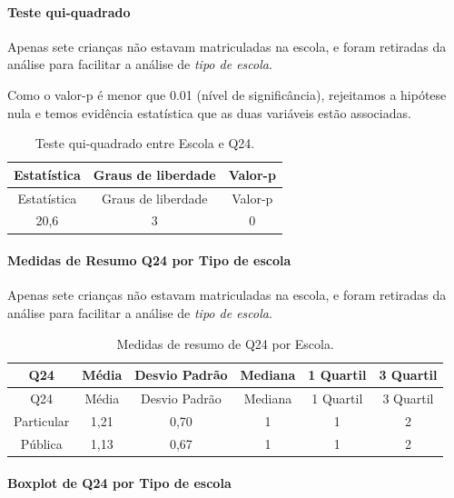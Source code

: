 \documentclass[]{article}
\let\oldparagraph\paragraph
\renewcommand{\paragraph}[1]{\oldparagraph{#1}\mbox{}}
\begin{document}
\hypertarget{teste-qui-quadrado-56}{%
\paragraph{Teste qui-quadrado}\label{teste-qui-quadrado-56}}

Apenas sete crianças não estavam matriculadas na escola, e foram retiradas da análise para facilitar a análise de \emph{tipo de escola}.

Como o valor-p é menor que 0.01 (nível de significância), rejeitamos a hipótese nula e temos evidência estatística que as duas variáveis estão associadas.

\begin{longtable}[]{@{}ccc@{}}
\caption{\label{tab:unnamed-chunk-645}Teste qui-quadrado entre Escola e Q24.}\tabularnewline
\toprule
Estatística & Graus de liberdade & Valor-p\tabularnewline
\midrule
\endfirsthead
\toprule
Estatística & Graus de liberdade & Valor-p\tabularnewline
\midrule
\endhead
20,6 & 3 & 0\tabularnewline
\bottomrule
\end{longtable}

\cleardoublepage

\hypertarget{medidas-de-resumo-q24-por-tipo-de-escola}{%
\paragraph{Medidas de Resumo Q24 por Tipo de escola}\label{medidas-de-resumo-q24-por-tipo-de-escola}}

Apenas sete crianças não estavam matriculadas na escola, e foram retiradas da análise para facilitar a análise de \emph{tipo de escola}.

\begin{longtable}[]{@{}cccccc@{}}
\caption{\label{tab:unnamed-chunk-646}Medidas de resumo de Q24 por Escola.}\tabularnewline
\toprule
Q24 & Média & Desvio Padrão & Mediana & 1 Quartil & 3 Quartil\tabularnewline
\midrule
\endfirsthead
\toprule
Q24 & Média & Desvio Padrão & Mediana & 1 Quartil & 3 Quartil\tabularnewline
\midrule
\endhead
Particular & 1,21 & 0,70 & 1 & 1 & 2\tabularnewline
Pública & 1,13 & 0,67 & 1 & 1 & 2\tabularnewline
\bottomrule
\end{longtable}

\hypertarget{boxplot-de-q24-por-tipo-de-escola}{%
\paragraph{Boxplot de Q24 por Tipo de escola}\label{boxplot-de-q24-por-tipo-de-escola}}
\end{document}
